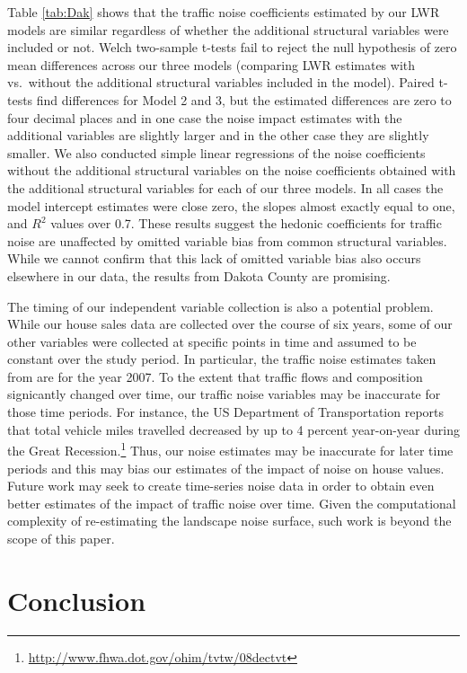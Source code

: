 \documentclass{article}\usepackage{graphicx, color}
\begin{document}
Table \ref{tab:Dak} shows that the traffic noise coefficients estimated by our LWR models are similar regardless of whether the additional structural variables were included or not. Welch two-sample t-tests fail to reject the null hypothesis of zero mean differences across our three models (comparing LWR estimates with vs.\ without the additional structural variables included in the model). Paired t-tests find differences for Model 2 and 3, but the estimated differences are zero to four decimal places and in one case the noise impact estimates with the additional variables are slightly larger and in the other case they are slightly smaller. We also conducted simple linear regressions of the noise coefficients without the additional structural variables on the noise coefficients obtained with the additional structural variables for each of our three models. In all cases the model intercept estimates were close zero, the slopes almost exactly equal to one, and $R^2$ values over 0.7. These results suggest the hedonic coefficients for traffic noise are unaffected by omitted variable bias from common structural variables. While we cannot confirm that this lack of omitted variable bias also occurs elsewhere in our data, the results from Dakota County are promising. 

The timing of our independent variable collection is also a potential problem. While our house sales data are collected over the course of six years, some of our other variables were collected at specific points in time and assumed to be constant over the study period. In particular, the traffic noise estimates taken from \citet{Nega2012} are for the year 2007. To the extent that traffic flows and composition signicantly changed over time, our traffic noise variables may be inaccurate for those time periods. For instance, the US Department of Transportation reports that total vehicle miles travelled decreased by up to 4 percent year-on-year during the Great Recession.\footnote{\url{http://www.fhwa.dot.gov/ohim/tvtw/08dectvt}} Thus, our noise estimates may be inaccurate for later time periods and this may bias our estimates of the impact of noise on house values. Future work may seek to create time-series noise data in order to obtain even better estimates of the impact of traffic noise over time. Given the computational complexity of re-estimating the landscape noise surface, such work is beyond the scope of this paper.

\section{Conclusion}
\end{document}
